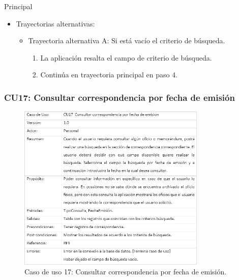 \begin{UCtrayectoria}{Principal}
\begin{itemize}
	\item Trayectorias alternativas:
	\begin{itemize}
		\item Trayectoria alternativa A: Si está vacío el criterio de búsqueda.
			\begin{enumerate}
				\item La aplicación resalta el campo de criterio de búsqueda.
				\item Continúa en trayectoria principal en paso 4.
			\end{enumerate}
	\end{itemize}
\end{itemize}
\newpage
		\subsubsection{CU17: Consultar correspondencia por fecha de emisión}
\begin{figure}[htbp!]
		\centering
			\includegraphics[width=0.8\textwidth]{images/CU/CU17}
		\caption{Caso de uso 17: Consultar correspondencia por fecha de emisión.}
		\label{Tabla}
	\end{figure}
	

\end{UCtrayectoria}

